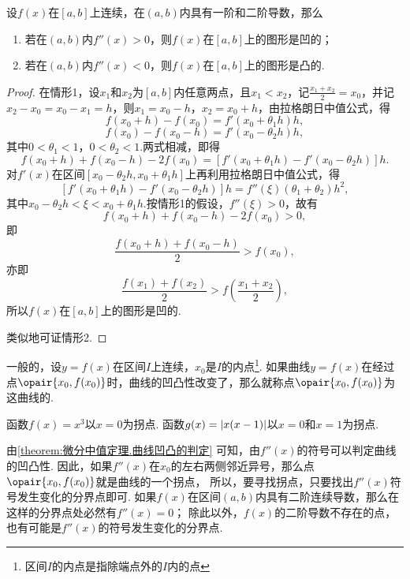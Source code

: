 \begin{theorem}[曲线凹凸的判定]\label{theorem:微分中值定理.曲线凹凸的判定}
设\(f(x)\)在\([a,b]\)上连续，在\((a,b)\)内具有一阶和二阶导数，那么
\begin{enumerate}
\item 若在\((a,b)\)内\(f''(x)>0\)，则\(f(x)\)在\([a,b]\)上的图形是凹的；
\item 若在\((a,b)\)内\(f''(x)<0\)，则\(f(x)\)在\([a,b]\)上的图形是凸的.
\end{enumerate}
\begin{proof}
在情形1，设\(x_1\)和\(x_2\)为\([a,b]\)内任意两点，且\(x_1 < x_2\)，记\(\frac{x_1 + x_2}{2} = x_0\)，并记\(x_2 - x_0 = x_0 - x_1 = h\)，则\(x_1 = x_0 - h\)，\(x_2 = x_0 + h\)，由拉格朗日中值公式，得\[
f(x_0 + h) - f(x_0) = f'(x_0 + \theta_1 h) h,
\]\[
f(x_0) - f(x_0 - h) = f'(x_0 - \theta_2 h) h,
\]其中\(0 < \theta_1 < 1\)，\(0 < \theta_2 < 1\).两式相减，即得\[
f(x_0 + h) + f(x_0 - h) - 2 f(x_0)
= [ f'(x_0 + \theta_1 h) - f'(x_0 - \theta_2 h) ] h.
\]对\(f'(x)\)在区间\([x_0 - \theta_2 h,x_0 + \theta_1 h]\)上再利用拉格朗日中值公式，得\[
[ f'(x_0 + \theta_1 h) - f'(x_0 - \theta_2 h) ] h
= f''(\xi) (\theta_1 + \theta_2) h^2,
\]其中\(x_0 - \theta_2 h < \xi < x_0 + \theta_1 h\).按情形1的假设，\(f''(\xi) > 0\)，故有\[
f(x_0 + h) + f(x_0 - h) - 2 f(x_0) > 0,
\]即\[
\frac{f(x_0 + h) + f(x_0 - h)}{2} > f(x_0),
\]亦即\[
\frac{f(x_1) + f(x_2)}{2} > f\left(\frac{x_1 + x_2}{2}\right),
\]所以\(f(x)\)在\([a,b]\)上的图形是凹的.

类似地可证情形2.
\end{proof}
\end{theorem}

\begin{definition}
一般的，设\(y=f(x)\)在区间\(I\)上连续，\(x_0\)是\(I\)的内点\footnote{区间\(I\)的内点是指除端点外的\(I\)内的点}.
如果曲线\(y=f(x)\)在经过点\(\opair{x_0,f(x_0)}\)时，曲线的凹凸性改变了，那么就称点\(\opair{x_0,f(x_0)}\)为这曲线的.
\end{definition}

\begin{example}
函数\(f(x) = x^3\)以\(x=0\)为拐点.
函数\(g(x) = \abs{x(x-1)}\)以\(x=0\)和\(x=1\)为拐点.
\end{example}

由\cref{theorem:微分中值定理.曲线凹凸的判定} 可知，由\(f''(x)\)的符号可以判定曲线的凹凸性.
因此，如果\(f''(x)\)在\(x_0\)的左右两侧邻近异号，那么点\(\opair{x_0,f(x_0)}\)就是曲线的一个拐点，%
所以，要寻找拐点，只要找出\(f''(x)\)符号发生变化的分界点即可.
如果\(f(x)\)在区间\((a,b)\)内具有二阶连续导数，那么在这样的分界点处必然有\(f''(x)=0\)；
除此以外，\(f(x)\)的二阶导数不存在的点，也有可能是\(f''(x)\)的符号发生变化的分界点.

